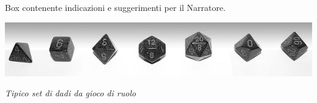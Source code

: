 \begin{multicols}{2}
\begin{changemargin}{0.3cm}{0.3cm}\begin{narratore}Box contenente indicazioni e suggerimenti per il Narratore.\end{narratore}\end{changemargin}

\end{multicols}



\vfill

\begin{center}
\includegraphics[keepaspectratio,width=0.95\linewidth]{immagini/dice.png}

\medskip

\emph{Tipico set di dadi da gioco di ruolo}
\end{center}

\pagebreak

